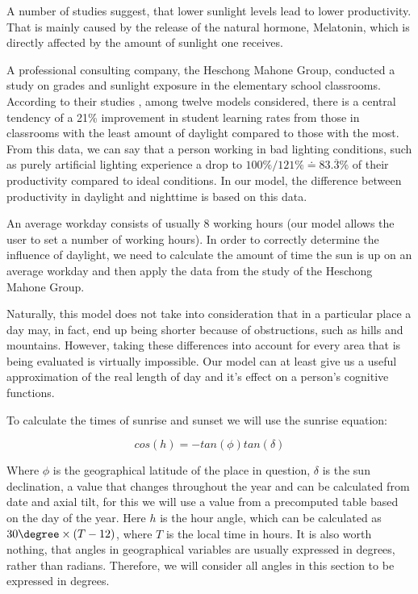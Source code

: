 
A number of studies suggest, that lower sunlight levels lead to lower productivity. That is mainly caused by the release of the natural hormone, Melatonin, which is directly affected by the amount of sunlight one receives.

A professional consulting company, the Heschong Mahone Group, conducted a study on grades and sunlight exposure in the elementary school classrooms. According to their studies \cite{daylight2002}, among twelve models considered, there is a central tendency of a 21\%  improvement in student learning rates from those in classrooms with the least amount of daylight compared to those with the most. From this data, we can say that a person working in bad lighting conditions, such as purely artificial lighting experience a drop to $100\%/121\%\doteq83.\overline{3}\%$ of their productivity compared to ideal conditions. In our model, the difference between productivity in daylight and nighttime is based on this data.

An average workday consists of usually 8 working hours (our model allows the user to set a number of working hours). In order to correctly determine the influence of daylight, we need to calculate the amount of time the sun is up on an average workday and then apply the data from the study of the Heschong Mahone Group. 

Naturally, this model does not take into consideration that in a particular place a day may, in fact, end up being shorter because of obstructions, such as hills and mountains. However, taking these differences into account for every area that is being evaluated is virtually impossible. Our model can at least give us a useful approximation of the real length of day and it's effect on a person's cognitive functions.

To calculate the times of sunrise and sunset we will use the sunrise equation:

$$cos(h)=-tan(\phi)tan(\delta)$$

Where $\phi$ is the geographical latitude of the place in question, $\delta$ is the sun declination, a value that changes throughout the year and can be calculated from date and axial tilt, for this we will use a value from a precomputed table based on the day of the year. Here $h$ is the hour angle, which can be calculated as $30\degree \times (T-12)$, where $T$ is the local time in hours. It is also worth nothing, that angles in geographical variables are usually expressed in degrees, rather than radians. Therefore, we will consider all angles in this section to be expressed in degrees.

